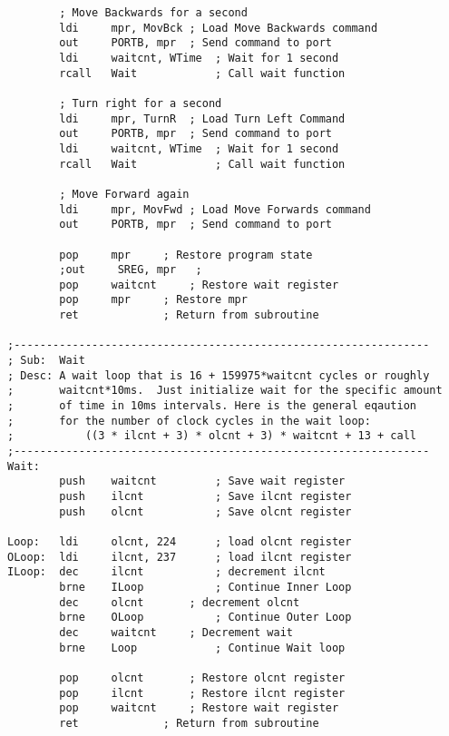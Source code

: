 \documentclass[12pt,letterpaper]{article}
\begin{document}
\begin{verbatim}
        ; Move Backwards for a second
        ldi     mpr, MovBck ; Load Move Backwards command
        out     PORTB, mpr  ; Send command to port
        ldi     waitcnt, WTime  ; Wait for 1 second
        rcall   Wait            ; Call wait function

        ; Turn right for a second
        ldi     mpr, TurnR  ; Load Turn Left Command
        out     PORTB, mpr  ; Send command to port
        ldi     waitcnt, WTime  ; Wait for 1 second
        rcall   Wait            ; Call wait function

        ; Move Forward again    
        ldi     mpr, MovFwd ; Load Move Forwards command
        out     PORTB, mpr  ; Send command to port

        pop     mpr     ; Restore program state
        ;out     SREG, mpr   ;
        pop     waitcnt     ; Restore wait register
        pop     mpr     ; Restore mpr
        ret             ; Return from subroutine

;----------------------------------------------------------------
; Sub:	Wait
; Desc:	A wait loop that is 16 + 159975*waitcnt cycles or roughly
;		waitcnt*10ms.  Just initialize wait for the specific amount
;		of time in 10ms intervals. Here is the general eqaution
;		for the number of clock cycles in the wait loop:
;			((3 * ilcnt + 3) * olcnt + 3) * waitcnt + 13 + call
;----------------------------------------------------------------
Wait:
		push	waitcnt			; Save wait register
		push	ilcnt			; Save ilcnt register
		push	olcnt			; Save olcnt register

Loop:	ldi		olcnt, 224		; load olcnt register
OLoop:	ldi		ilcnt, 237		; load ilcnt register
ILoop:	dec		ilcnt			; decrement ilcnt
		brne	ILoop			; Continue Inner Loop
		dec		olcnt		; decrement olcnt
		brne	OLoop			; Continue Outer Loop
		dec		waitcnt		; Decrement wait
		brne	Loop			; Continue Wait loop	

		pop		olcnt		; Restore olcnt register
		pop		ilcnt		; Restore ilcnt register
		pop		waitcnt		; Restore wait register
		ret				; Return from subroutine
\end{verbatim}
\end{document}
